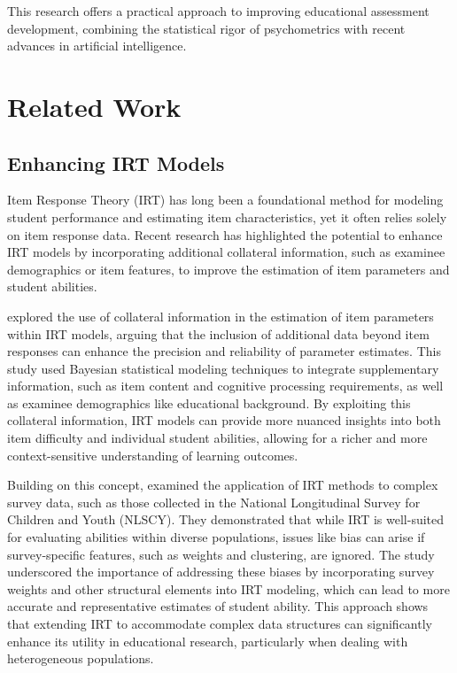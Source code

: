 \documentclass[
    a4paper, %
    10pt, %
    twoside, %
]{LTJournalArticle}
\begin{document}
This research offers a practical approach to improving educational assessment development, combining the statistical rigor of psychometrics with recent advances in artificial intelligence.

\section{Related Work}

\subsection{Enhancing IRT Models}
Item Response Theory (IRT) has long been a foundational method for modeling student performance and estimating item characteristics, yet it often relies solely on item response data. Recent research has highlighted the potential to enhance IRT models by incorporating additional collateral information, such as examinee demographics or item features, to improve the estimation of item parameters and student abilities.

\textcite{mislevy1988collateral} explored the use of collateral information in the estimation of item parameters within IRT models, arguing that the inclusion of additional data beyond item responses can enhance the precision and reliability of parameter estimates. This study used Bayesian statistical modeling techniques to integrate supplementary information, such as item content and cognitive processing requirements, as well as examinee demographics like educational background. By exploiting this collateral information, IRT models can provide more nuanced insights into both item difficulty and individual student abilities, allowing for a richer and more context-sensitive understanding of learning outcomes.

Building on this concept, \textcite{thomas2002complex} examined the application of IRT methods to complex survey data, such as those collected in the National Longitudinal Survey for Children and Youth (NLSCY). They demonstrated that while IRT is well-suited for evaluating abilities within diverse populations, issues like bias can arise if survey-specific features, such as weights and clustering, are ignored. The study underscored the importance of addressing these biases by incorporating survey weights and other structural elements into IRT modeling, which can lead to more accurate and representative estimates of student ability. This approach shows that extending IRT to accommodate complex data structures can significantly enhance its utility in educational research, particularly when dealing with heterogeneous populations.
\end{document}
